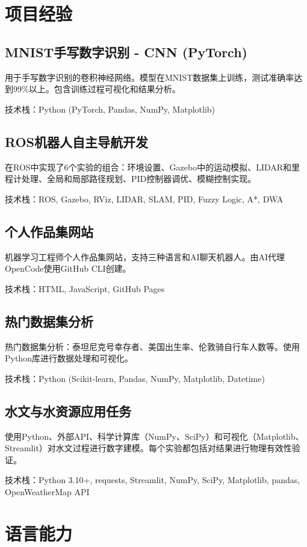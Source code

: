 \documentclass[12pt,a4paper]{article}
\begin{document}
\section{项目经验}

\subsection{MNIST手写数字识别 - CNN (PyTorch)}
用于手写数字识别的卷积神经网络。模型在MNIST数据集上训练，测试准确率达到99\%以上。包含训练过程可视化和结果分析。

技术栈：Python (PyTorch, Pandas, NumPy, Matplotlib)

\subsection{ROS机器人自主导航开发}
在ROS中实现了6个实验的组合：环境设置、Gazebo中的运动模拟、LIDAR和里程计处理、全局和局部路径规划、PID控制器调优、模糊控制实现。

技术栈：ROS, Gazebo, RViz, LIDAR, SLAM, PID, Fuzzy Logic, A*, DWA

\subsection{个人作品集网站}
机器学习工程师个人作品集网站，支持三种语言和AI聊天机器人。由AI代理OpenCode使用GitHub CLI创建。

技术栈：HTML, JavaScript, GitHub Pages

\subsection{热门数据集分析}
热门数据集分析：泰坦尼克号幸存者、美国出生率、伦敦骑自行车人数等。使用Python库进行数据处理和可视化。

技术栈：Python (Scikit-learn, Pandas, NumPy, Matplotlib, Datetime)

\subsection{水文与水资源应用任务}
使用Python、外部API、科学计算库（NumPy、SciPy）和可视化（Matplotlib、Streamlit）对水文过程进行数字建模。每个实验都包括对结果进行物理有效性验证。

技术栈：Python 3.10+, requests, Streamlit, NumPy, SciPy, Matplotlib, pandas, OpenWeatherMap API

\section{语言能力}
\end{document}
